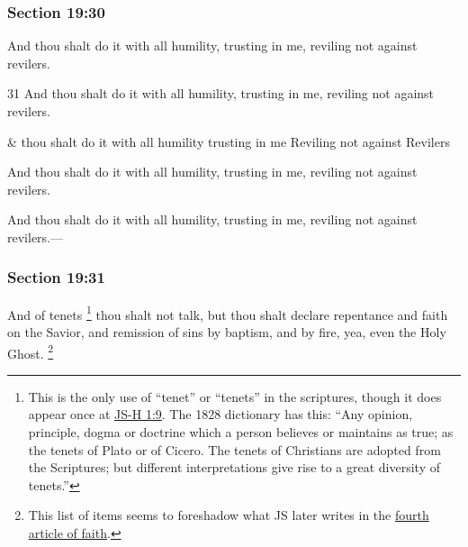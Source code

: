 	\subsubsection{Section 19:30} %
		\label{DC19-30}

		And thou shalt do it with all humility, trusting in me, reviling not against revilers.

		\begin{framed}
		\scriptsize
			\begin{compactdesc}
				\item[JSP] 31 And thou shalt do it with all humility, trusting in me, reviling not against revilers.
				\item[RB1] \& thou shalt do it with all humility trusting in me Reviling not against Revilers
				\item[DC 1835] And thou shalt do it with all humility, trusting in me, reviling not against revilers. 
				\item[DC 1844] And thou shalt do it with all humility, trusting in me, reviling not against revilers.---
			\end{compactdesc}
		\end{framed}

	\subsubsection{Section 19:31} %
		\label{DC19-31}

		And of tenets%
		\footnote{%
			This is the only use of ``tenet'' or ``tenets'' in the scriptures, though it does appear once at \hyperref[JSHISTORY-1-9]{JS-H 1:9}. The 1828 dictionary has this: ``Any opinion, principle, dogma or doctrine which a person believes or maintains as true; as the tenets of Plato or of Cicero. The tenets of Christians are adopted from the Scriptures; but different interpretations give rise to a great diversity of tenets.''
			} 
		thou shalt not talk, but thou shalt declare repentance and faith on the Savior, and remission of sins by baptism, and by fire, yea, even the Holy Ghost.%
			\footnote{%
				This list of items seems to foreshadow what JS later writes in the \hyperref[ARTICLESOFFAITH]{fourth article of faith}.
				} 

